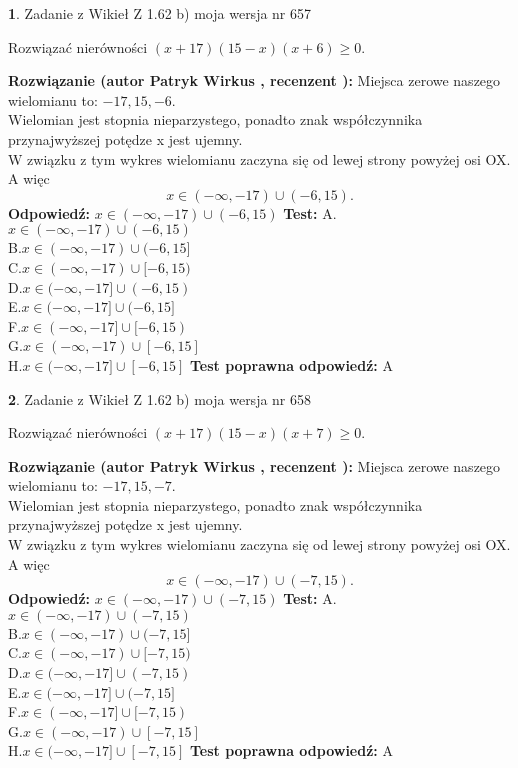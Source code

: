\documentclass[12pt, a4paper]{article}
\theoremstyle{definition} %
\newtheorem{zad}{}
\newcommand{\zadStart}[1]{\begin{zad}#1\newline}
\newcommand{\zadStop}{\end{zad}}
\newcommand{\rozwStart}[2]{\noindent \textbf{Rozwiązanie (autor #1 , recenzent #2): }\newline}
\newcommand{\rozwStop}{\newline}
\newcommand{\odpStart}{\noindent \textbf{Odpowiedź:}\newline}
\newcommand{\odpStop}{\newline}
\newcommand{\testStart}{\noindent \textbf{Test:}\newline}
\newcommand{\testStop}{\newline}
\newcommand{\kluczStart}{\noindent \textbf{Test poprawna odpowiedź:}\newline}
\newcommand{\kluczStop}{\newline}
\begin{document}
\zadStart{Zadanie z Wikieł Z 1.62 b) moja wersja nr 657}

Rozwiązać nierówności $(x+17)(15-x)(x+6)\ge0$.
\zadStop
\rozwStart{Patryk Wirkus}{}
Miejsca zerowe naszego wielomianu to: $-17, 15, -6$.\\
Wielomian jest stopnia nieparzystego, ponadto znak współczynnika przy\linebreak najwyższej potędze x jest ujemny.\\ W związku z tym wykres wielomianu zaczyna się od lewej strony powyżej osi OX. A więc $$x \in (-\infty,-17) \cup (-6,15).$$
\rozwStop
\odpStart
$x \in (-\infty,-17) \cup (-6,15)$
\odpStop
\testStart
A.$x \in (-\infty,-17) \cup (-6,15)$\\
B.$x \in (-\infty,-17) \cup (-6,15]$\\
C.$x \in (-\infty,-17) \cup [-6,15)$\\
D.$x \in (-\infty,-17] \cup (-6,15)$\\
E.$x \in (-\infty,-17] \cup (-6,15]$\\
F.$x \in (-\infty,-17] \cup [-6,15)$\\
G.$x \in (-\infty,-17) \cup [-6,15]$\\
H.$x \in (-\infty,-17] \cup [-6,15]$
\testStop
\kluczStart
A
\kluczStop



\zadStart{Zadanie z Wikieł Z 1.62 b) moja wersja nr 658}

Rozwiązać nierówności $(x+17)(15-x)(x+7)\ge0$.
\zadStop
\rozwStart{Patryk Wirkus}{}
Miejsca zerowe naszego wielomianu to: $-17, 15, -7$.\\
Wielomian jest stopnia nieparzystego, ponadto znak współczynnika przy\linebreak najwyższej potędze x jest ujemny.\\ W związku z tym wykres wielomianu zaczyna się od lewej strony powyżej osi OX. A więc $$x \in (-\infty,-17) \cup (-7,15).$$
\rozwStop
\odpStart
$x \in (-\infty,-17) \cup (-7,15)$
\odpStop
\testStart
A.$x \in (-\infty,-17) \cup (-7,15)$\\
B.$x \in (-\infty,-17) \cup (-7,15]$\\
C.$x \in (-\infty,-17) \cup [-7,15)$\\
D.$x \in (-\infty,-17] \cup (-7,15)$\\
E.$x \in (-\infty,-17] \cup (-7,15]$\\
F.$x \in (-\infty,-17] \cup [-7,15)$\\
G.$x \in (-\infty,-17) \cup [-7,15]$\\
H.$x \in (-\infty,-17] \cup [-7,15]$
\testStop
\kluczStart
A
\kluczStop
\end{document}
